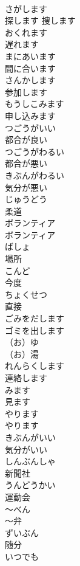 \documentclass[8pt]{extreport}
\begin{document}
\begin{CJK}{UTF8}{min}
\\	さがします	
\\	探します 捜します	
\\	おくれます	
\\	遅れます	
\\	まにあいます	
\\	間に合います	
\\	さんかします	
\\	参加します	
\\	もうしこみます	
\\	申し込みます	
\\	つごうがいい	
\\	都合が良い	
\\	つごうがわるい	
\\	都合が悪い	
\\	きぶんがわるい	
\\	気分が悪い	
\\	じゅうどう	
\\	柔道	
\\	ボランティア	
\\	ボランティア	
\\	ばしょ	
\\	場所	
\\	こんど	
\\	今度	
\\	ちょくせつ	
\\	直接	
\\	ごみをだします	
\\	ゴミを出します	
\\	（お）ゆ	
\\	（お）湯	
\\	れんらくします	
\\	連絡します	
\\	みます	
\\	見ます		
\\	やります	
\\	やります		
\\	きぶんがいい	
\\	気分がいい		
\\	しんぶんしゃ	
\\	新聞社		
\\	うんどうかい	
\\	運動会		
\\	〜べん	
\\	〜弁		
\\	ずいぶん	
\\	随分		
\\	いつでも	

\end{CJK}
\end{document}
